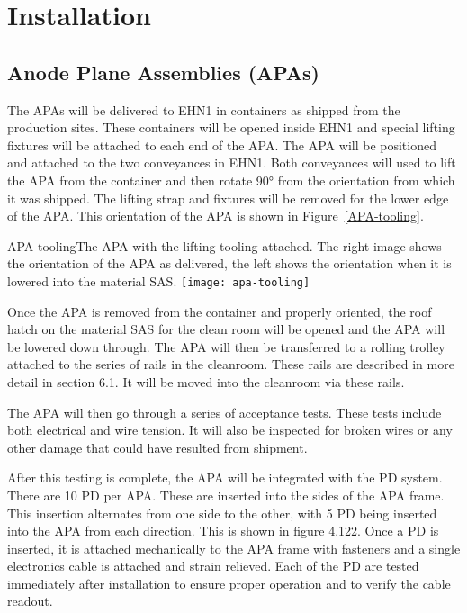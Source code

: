 
\section{Installation}


\subsection{Anode Plane Assemblies (APAs)}

The APAs will be delivered to EHN1 in containers as shipped from the production sites.  These containers will be opened inside EHN1 and special lifting fixtures will be attached to each end of the APA.  The APA will be positioned and attached to the two conveyances in EHN1.  Both conveyances will used to lift the APA from the container and then rotate 90° from the orientation from which it was shipped.  The lifting strap and fixtures will be removed for the lower edge of the APA.  This orientation of the APA is shown in Figure~\ref{APA-tooling}.

\begin{cdrfigure}{APA-tooling}{The APA with the lifting tooling attached.  The right image shows the orientation of the APA as delivered, the left shows the orientation when it is lowered into the material SAS. }
\texttt{[image: apa-tooling]}
\end{cdrfigure}

Once the APA is removed from the container and properly oriented, the roof hatch on the material SAS for the clean room will be opened and the APA will be lowered down through.  The APA will then be transferred to a rolling trolley attached to the series of rails in the cleanroom.  These rails are described in more detail in section 6.1.  It will be moved into the cleanroom via these rails.  

The APA will then go through a series of acceptance tests.  These tests include both electrical and wire tension.  It will also be inspected for broken wires or any other damage that could have resulted from shipment.  

After this testing is complete, the APA will be integrated with the PD system.  There are 10 PD per APA.  These are inserted into the sides of the APA frame.  This insertion alternates from one side to the other, with 5 PD being inserted into the APA from each direction.  This is shown in figure 4.122.  Once a PD is inserted, it is attached mechanically to the APA frame with fasteners and a single electronics cable is attached and strain relieved.  Each of the PD are tested immediately after installation to ensure proper operation and to verify the cable readout.  


